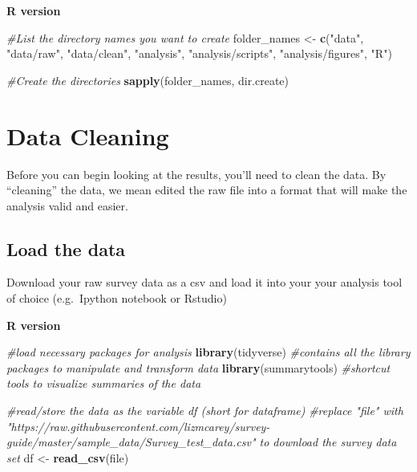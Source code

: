 \documentclass[]{book}
\newenvironment{Shaded}{\begin{snugshade}}{\end{snugshade}}
\newcommand{\KeywordTok}[1]{\textcolor[rgb]{0.13,0.29,0.53}{\textbf{#1}}}
\newcommand{\StringTok}[1]{\textcolor[rgb]{0.31,0.60,0.02}{#1}}
\newcommand{\CommentTok}[1]{\textcolor[rgb]{0.56,0.35,0.01}{\textit{#1}}}
\newcommand{\NormalTok}[1]{#1}
\begin{document}
\textbf{R version}

\begin{Shaded}
\begin{Highlighting}[]
\CommentTok{#List the directory names you want to create}
\NormalTok{folder_names <-}\StringTok{ }\KeywordTok{c}\NormalTok{(}\StringTok{"data"}\NormalTok{, }
                    \StringTok{"data/raw"}\NormalTok{, }
                    \StringTok{"data/clean"}\NormalTok{, }
                  \StringTok{"analysis"}\NormalTok{, }
                    \StringTok{"analysis/scripts"}\NormalTok{, }
                     \StringTok{"analysis/figures"}\NormalTok{, }
                  \StringTok{"R"}\NormalTok{)}

\CommentTok{#Create the directories}
\KeywordTok{sapply}\NormalTok{(folder_names, dir.create)}
\end{Highlighting}
\end{Shaded}

\section{Data Cleaning}\label{data-cleaning}

Before you can begin looking at the results, you'll need to clean the
data. By ``cleaning'' the data, we mean edited the raw file into a
format that will make the analysis valid and easier.

\subsection{Load the data}\label{load-the-data}

Download your raw survey data as a csv and load it into your your
analysis tool of choice (e.g.~Ipython notebook or Rstudio)

\textbf{R version}

\begin{Shaded}
\begin{Highlighting}[]
\CommentTok{#load necessary packages for analysis}
\KeywordTok{library}\NormalTok{(tidyverse)        }\CommentTok{#contains all the library packages to manipulate and transform data}
\KeywordTok{library}\NormalTok{(summarytools)     }\CommentTok{#shortcut tools to visualize summaries of the data}

\CommentTok{#read/store the data as the variable df (short for dataframe)}
\CommentTok{#replace "file" with "https://raw.githubusercontent.com/lizmcarey/survey-guide/master/sample_data/Survey_test_data.csv" to download the survey data set}
\NormalTok{df <-}\StringTok{ }\KeywordTok{read_csv}\NormalTok{(file)}
\end{Highlighting}
\end{Shaded}
\end{document}
